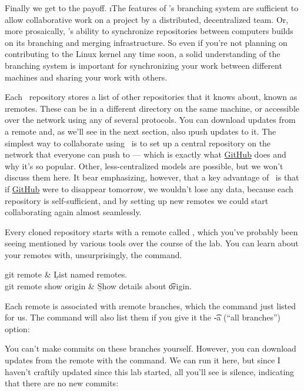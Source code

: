 \documentclass[letterpaper, 12pt, titlepage, twoside]{article}
\begin{document}
Finally we get to the payoff. \i{The features of \git's branching system are
  sufficient to allow collaborative work on a project by a distributed,
  decentralized team.} Or, more prosaically, \git's ability to synchronize
repositories between computers builds on its branching and merging
infrastructure. So even if you're not planning on contributing to the Linux
kernel any time soon, a solid understanding of the branching system is
important for synchronizing your work between different machines and sharing
your work with others.

Each \git\ repository stores a list of other repositories that it knows about,
known as \i{remotes}. These can be in a different directory on the same
machine, or accessible over the network using any of several protocols. You
can download updates from a remote and, as we'll see in the next section, also
\i{push} updates to it. The simplest way to collaborate using \git\ is to set
up a central repository on the network that everyone can push to --- which is
exactly what \href{https://github.com/}{GitHub} does and why it's so popular.
Other, less-centralized models are possible, but we won't discuss them here.
It bear emphasizing, however, that a key advantage of \git\ is that if
\href{https://github.com/}{GitHub} were to disappear tomorrow, we wouldn't
lose any data, because each repository is self-sufficient, and by setting up
new remotes we could start collaborating again almost seamlessly.

Every cloned repository starts with a remote called , which you've
probably been seeing mentioned by various tools over the course of the lab.
You can learn about your remotes with, unsurprisingly, the 
command.

\begin{typeme}
git remote & \b{List named remotes.} \\
git remote show origin & \b{Show details about \t{origin}.}
\end{typeme}

Each remote is associated with \i{remote branches}, which the  command just listed for us. The  command will also list
them if you give it the \t{-a} (``all branches'') option:


You can't make commits on these branches yourself. However, you can download
updates from the remote with the  command. We can run it here, but
since I haven't craftily updated  since this lab started, all you'll
see is silence, indicating that there are no new commits:
\end{document}
